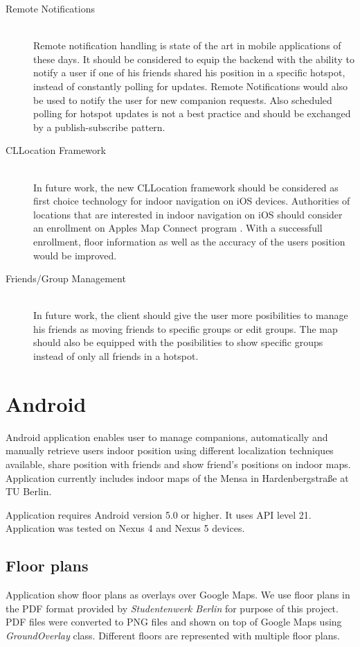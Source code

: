 \begin{description}
  \item[Remote Notifications] \hfill \\
  Remote notification handling is state of the art in mobile applications of these days. It should be considered to equip the backend with the ability to notify a user if one of his friends shared his position in a specific hotspot, instead of constantly polling for updates. Remote Notifications would also be used to notify the user for new companion requests. Also scheduled polling for hotspot updates is not a best practice and should be exchanged by a publish-subscribe pattern.
  \item[CLLocation Framework] \hfill \\
  In future work, the new CLLocation framework should be considered as first choice technology for indoor navigation on iOS devices. Authorities of locations that are interested in indoor navigation on iOS should consider an enrollment on Apples Map Connect program \cite{MapsConnect}. With a successfull enrollment, floor information as well as the accuracy of the users position would be improved.
  \item[Friends/Group Management] \hfill \\
  In future work, the client should give the user more posibilities to manage his friends as moving friends to specific groups or edit groups. The map should also be equipped with the posibilities to show specific groups instead of only all friends in a hotspot.

\end{description}

\vspace{0.5cm}

\section{Android}

Android application enables user to manage companions, automatically and manually retrieve users indoor position using different localization techniques available, share position with friends and show friend's positions on indoor maps. Application currently includes indoor maps of the Mensa in Hardenbergstraße at TU Berlin.

Application requires Android version 5.0 or higher. It uses API level 21. Application was tested on Nexus 4 and Nexus 5 devices.

\subsection{Floor plans}
Application show floor plans as overlays over Google Maps. We use floor plans in the PDF format provided by \textit{Studentenwerk Berlin} for purpose of this project. PDF files were converted to PNG files and shown on top of Google Maps using \textit{GroundOverlay} class. Different floors are represented with multiple floor plans.

